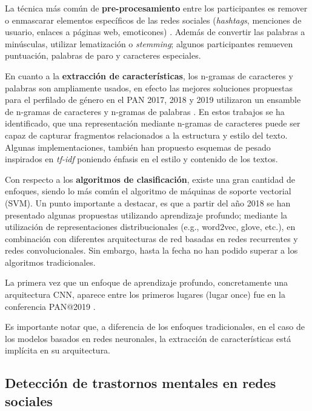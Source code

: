 La técnica más común de \textbf{pre-procesamiento} entre los participantes es remover o enmascarar elementos específicos de las redes sociales (\textit{hashtags}, menciones de usuario, enlaces a páginas web, emoticones) \citep{daneshvar2018gender, jimenez2019bots, Pizarro2019}. Además de convertir las palabras a minúsculas, utilizar lematización o \textit{stemming}; algunos participantes remueven puntuación, palabras de paro y caracteres especiales.

En cuanto a la \textbf{extracción de características}, los n-gramas de caracteres y palabras son ampliamente usados, en efecto las mejores soluciones propuestas para el perfilado de género en el PAN 2017, 2018 y 2019 utilizaron un ensamble de n-gramas de caracteres y n-gramas de palabras \citep{basile2017there, daneshvar2018gender, Pizarro2019}. En estos trabajos se ha identificado, que una representación mediante n-gramas de caracteres puede ser capaz de capturar fragmentos relacionados a la estructura y estilo del texto. Algunas implementaciones, también han propuesto esquemas de pesado inspirados en \textit{tf-idf} poniendo énfasis en el estilo y contenido de los textos.

Con respecto a los \textbf{algoritmos de clasificación}, existe una gran cantidad de enfoques, siendo lo más común el algoritmo de máquinas de soporte vectorial (SVM). Un punto importante a destacar, es que a partir del año 2018 se han presentado algunas propuestas utilizando aprendizaje profundo; mediante la utilización de representaciones distribucionales (e.g., word2vec, glove, etc.), en combinación con diferentes arquitecturas de red basadas en redes recurrentes y redes convolucionales. Sin embargo, hasta la fecha no han podido superar a los algoritmos tradicionales.


La primera vez que un enfoque de aprendizaje profundo, concretamente una arquitectura CNN, aparece entre los primeros lugares (lugar once) fue en la conferencia PAN@2019 \citep{Rangel2019}. 

Es importante notar que, a diferencia de los enfoques tradicionales, en el caso de los modelos basados en redes neuronales, la extracción de características está implícita en su arquitectura.

\subsection{Detección de trastornos mentales en redes sociales}

